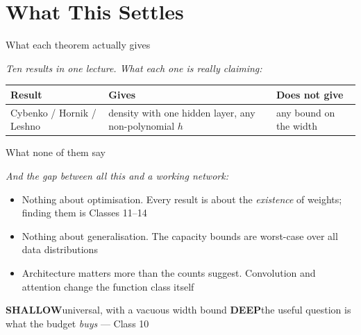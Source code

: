 \documentclass[aspectratio=169, 11pt]{beamer}
\newcommand{\shpar}[2]{%
  \vfill
  {\scriptsize
  \begin{tcolorbox}[enhanced, sidebyside, sidebyside align=top,
                    lefthand ratio=0.485,
                    segmentation style={shc!35, line width=0.6pt},
                    colback=shc!5, colframe=shc!35, boxrule=0.5pt,
                    arc=1.2mm, left=1.6mm, right=1.6mm,
                    top=0.6mm, bottom=0.6mm,
                    before skip=0pt, after skip=0pt]
    {\color{shc}\textbf{SHALLOW}}\hspace{0.55em}#1
  \tcblower
    {\color{dpc}\textbf{DEEP}}\hspace{0.55em}#2
  \end{tcolorbox}}%
  \vspace{0.35em}%
}
\newcommand{\bridge}[1]{%
  {\scriptsize\itshape\color{mcMuted} #1\par}\vspace{0.35em}}
\begin{document}
\section{What This Settles}

\begin{frame}{What each theorem actually gives}
  \bridge{Ten results in one lecture. What each one is really claiming:}
  \centering
  \vspace{0.2em}
  \renewcommand{\arraystretch}{1.22}
  {\scriptsize
  \begin{tabular}{p{} p{}
                  p{}}
    \textbf{Result} & \textbf{Gives} & \textbf{Does not give}\\
    \hline
    Cybenko / Hornik / Leshno
      & density with one hidden layer, any non-polynomial $h$
      & any bound on the width\\
    \hline
  \end{tabular}}
\end{frame}

\begin{frame}{What none of them say}
  \bridge{And the gap between all this and a working network:}
  \vspace{0.2em}
  \begin{itemize}\setlength{\itemsep}{0pt}
    \item \alert{Nothing about optimisation.} Every result is about the
          \emph{existence} of weights; finding them is Classes 11--14
    \item \alert{Nothing about generalisation.} The capacity bounds
          are worst-case over all data distributions
    \item \alert{Architecture matters more than the counts suggest.}
          Convolution and attention change the function class itself
  \end{itemize}
  \shpar{universal, with a vacuous width bound}
        {the useful question is what the budget \emph{buys} --- Class 10}
\end{frame}
\end{document}
